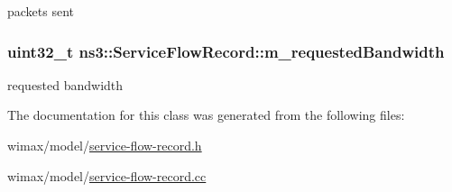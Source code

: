 packets sent 

\subsubsection[{\texorpdfstring{m\+\_\+requested\+Bandwidth}{m_requestedBandwidth}}]{\setlength{\rightskip}{0pt plus 5cm}uint32\+\_\+t ns3\+::\+Service\+Flow\+Record\+::m\+\_\+requested\+Bandwidth\hspace{0.3cm}{\ttfamily [private]}}\hypertarget{classns3_1_1ServiceFlowRecord_abb3ef2b08f8535755b0c95a5f3f9674a}{}\label{classns3_1_1ServiceFlowRecord_abb3ef2b08f8535755b0c95a5f3f9674a}


requested bandwidth 



The documentation for this class was generated from the following files\+:\begin{DoxyCompactItemize}
\item 
wimax/model/\hyperlink{service-flow-record_8h}{service-\/flow-\/record.\+h}\item 
wimax/model/\hyperlink{service-flow-record_8cc}{service-\/flow-\/record.\+cc}\end{DoxyCompactItemize}
